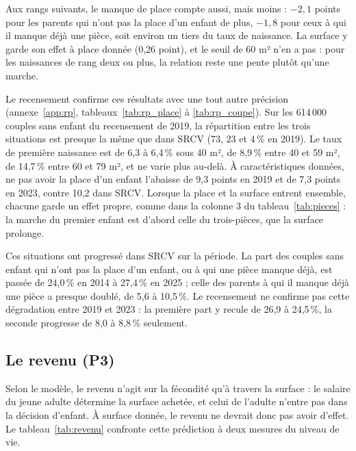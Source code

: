 \documentclass[11pt,a4paper]{article}
\theoremstyle{plain}
\theoremstyle{definition}
\theoremstyle{remark}
\begin{document}
Aux rangs suivants, le manque de place compte aussi, mais moins : $-2{,}1$ points pour les parents qui n'ont pas la place d'un enfant de plus, $-1{,}8$ pour ceux à qui il manque déjà une pièce, soit environ un tiers du taux de naissance. La surface y garde son effet à place donnée (0,26 point), et le seuil de 60 m² n'en a pas : pour les naissances de rang deux ou plus, la relation reste une pente plutôt qu'une marche.

Le recensement confirme ces résultats avec une tout autre précision (annexe~\ref{app:rp}, tableaux~\ref{tab:rp_place} à \ref{tab:rp_coupe}). Sur les 614\,000 couples sans enfant du recensement de 2019, la répartition entre les trois situations est presque la même que dans SRCV (73, 23 et 4\,\% en 2019). Le taux de première naissance est de 6,3 à 6,4\,\% sous 40 m², de 8,9\,\% entre 40 et 59 m², de 14,7\,\% entre 60 et 79 m², et ne varie plus au-delà. À caractéristiques données, ne pas avoir la place d'un enfant l'abaisse de 9,3 points en 2019 et de 7,3 points en 2023, contre 10,2 dans SRCV. Lorsque la place et la surface entrent ensemble, chacune garde un effet propre, comme dans la colonne 3 du tableau~\ref{tab:pieces} : la marche du premier enfant est d'abord celle du trois-pièces, que la surface prolonge.

Ces situations ont progressé dans SRCV sur la période. La part des couples sans enfant qui n'ont pas la place d'un enfant, ou à qui une pièce manque déjà, est passée de 24,0\,\% en 2014 à 27,4\,\% en 2025 ; celle des parents à qui il manque déjà une pièce a presque doublé, de 5,6 à 10,5\,\%. Le recensement ne confirme pas cette dégradation entre 2019 et 2023 : la première part y recule de 26,9 à 24,5\,\%, la seconde progresse de 8,0 à 8,8\,\% seulement.

\subsection{Le revenu (P3)}\label{sec:revenu}

Selon le modèle, le revenu n'agit sur la fécondité qu'à travers la surface : le salaire du jeune adulte détermine la surface achetée, et celui de l'adulte n'entre pas dans la décision d'enfant. À surface donnée, le revenu ne devrait donc pas avoir d'effet. Le tableau~\ref{tab:revenu} confronte cette prédiction à deux mesures du niveau de vie.
\end{document}
